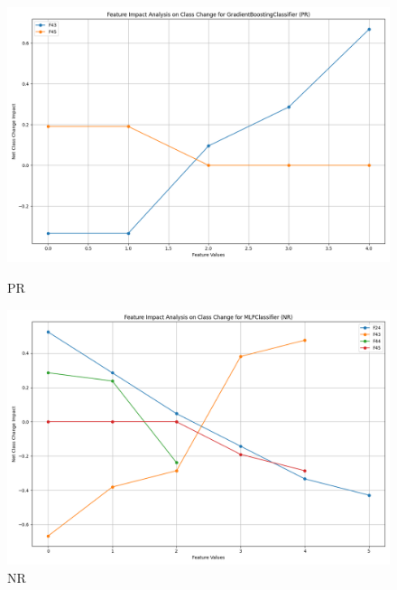 \begin{figure}[H]
    \centering
    \begin{minipage}{0.495\textwidth}
        \centering
        \includegraphics[width=\linewidth]{analysis/images/feature_impact_class_change_PR_GradientBoostingClassifier.png}
        \caption{PR}
        \label{fig:pr_class_analysis}
    \end{minipage}\hfill
    \begin{minipage}{0.495\textwidth}
        \centering
        \includegraphics[width=\linewidth]{analysis/images/feature_impact_class_change_NR_MLPClassifier.png}
        \caption{NR}
        \label{fig:nr_class_analysis}
    \end{minipage}
\end{figure}

